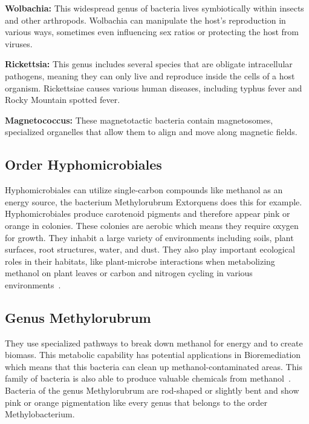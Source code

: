\textbf{Wolbachia:} This widespread genus of bacteria lives symbiotically within insects and other
arthropods.
Wolbachia can manipulate the host's reproduction in various ways,
sometimes even influencing sex ratios or protecting the host from viruses.

\textbf{Rickettsia:} This genus includes several species that are obligate intracellular pathogens,
meaning they can only live and reproduce inside the cells of a host organism. Rickettsiae
causes various human diseases, including typhus fever and Rocky Mountain spotted fever.

\textbf{Magnetococcus:} These magnetotactic bacteria contain magnetosomes, specialized
organelles that allow them to align and move along magnetic fields.

\subsection{Order Hyphomicrobiales}
Hyphomicrobiales can utilize single-carbon compounds like methanol as an energy
source, the bacterium Methylorubrum Extorquens does this for example.
Hyphomicrobiales produce carotenoid pigments and therefore appear pink or orange in
colonies. These colonies are aerobic which means they require oxygen for growth. They
inhabit a large variety of environments including soils, plant surfaces, root structures,
water, and dust.
They also play important ecological roles in their habitats, like plant-microbe interactions
when metabolizing methanol on plant leaves or carbon and nitrogen cycling in various
environments~\cite{methylobacteria_groups}.

\subsection{Genus Methylorubrum}
They use specialized pathways to break down methanol for energy and to create
biomass. This metabolic capability has potential applications in Bioremediation which
means that this bacteria can clean up methanol-contaminated areas. This family of
bacteria is also able to produce valuable chemicals from methanol~\cite{new_methylorubrum}.
Bacteria of the genus Methylorubrum are rod-shaped or slightly bent and show pink or
orange pigmentation like every genus that belongs to the order Methylobacterium.


